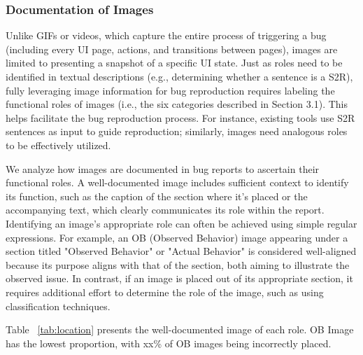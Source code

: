 \subsubsection{Documentation of Images} 


Unlike GIFs or videos, which capture the entire process of triggering a bug (including every UI page, actions, and transitions between pages), images are limited to presenting a snapshot of a specific UI state. Just as roles need to be identified in textual descriptions (e.g., determining whether a sentence is a S2R), fully leveraging image information for bug reproduction requires labeling the functional roles of images 
(i.e., the six categories described in Section 3.1). This helps facilitate the bug reproduction process. For instance, existing tools use S2R sentences as input to guide reproduction; similarly, images need analogous roles to be effectively utilized. 

We analyze how images are documented in bug reports to ascertain their functional roles. A well-documented image includes sufficient context to identify its function, such as the caption of the section where it's placed or the accompanying text, which clearly communicates its role within the report. Identifying an image’s appropriate role can often be achieved using simple regular expressions. For example, an OB (Observed Behavior) image appearing under a section titled "Observed Behavior" or "Actual Behavior" is considered well-aligned because its purpose aligns with that of the section, both aiming to illustrate the observed issue.
%
In contrast, if an image is placed out of its appropriate section, it requires additional effort to determine the role of the image,
such as using classification techniques. 


Table ~\ref{tab:location} presents the well-documented image of each role. OB Image has the lowest proportion, with xx\% of OB images being incorrectly placed.


